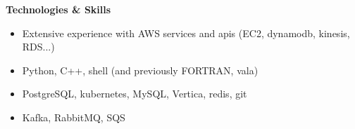 \vspace{\mybigskip}
\myfontsize{\littleheader}
\textbf{Technologies \& Skills}\\
\myfontsize{\bodysize}
\begin{itemize}[topsep=1ex, partopsep=0ex, parsep=0ex, itemsep=0.4ex]
    \item Extensive experience with AWS services and apis (EC2, dynamodb, kinesis, RDS...)
    \item Python, C++, shell (and previously FORTRAN, vala)
    \item PostgreSQL, kubernetes, MySQL, Vertica, redis, git
    \item Kafka, RabbitMQ, SQS
\end{itemize}


\iffalse

\fi

